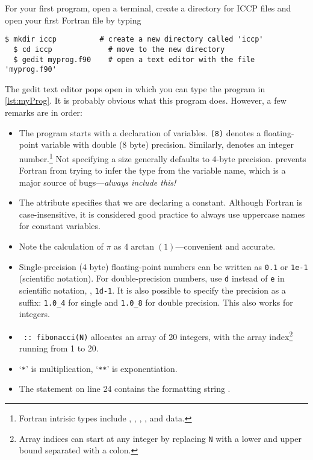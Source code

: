 For your first program, open a terminal, create a directory for ICCP files and open your first Fortran file by typing
\begin{lstlisting}[style=prompt, nolol]
  $ mkdir iccp          # create a new directory called 'iccp'
  $ cd iccp             # move to the new directory
  $ gedit myprog.f90    # open a text editor with the file 'myprog.f90'
\end{lstlisting}
The gedit text editor pops open in which you can type the program in \autoref{lst:myProg}.
It is probably obvious what this program does. However, a few remarks are in order:
\begin{itemize}
  \item The program starts with a declaration of variables.
    \texttt{(8)} denotes a floating-point variable with double (8 byte) precision.
    Similarly,  denotes an integer number.\footnote{Fortran intrisic types include , , , , and  data.}
    Not specifying a size generally defaults to 4-byte precision.
     prevents Fortran from trying to infer the type from the variable name, which is a major source of bugs---\emph{always include this!}
  \item The attribute  specifies that we are declaring a constant.
    Although Fortran is case-insensitive, it is considered good practice to always use uppercase names for constant variables.
  \item Note the calculation of $\pi$ as $4\arctan(1)$---convenient and accurate.
  \item Single-precision (4 byte) floating-point numbers can be written as \texttt{0.1} or \texttt{1e-1} (scientific notation).
    For double-precision numbers, use \texttt{d} instead of \texttt{e} in scientific notation, \eg, \texttt{1d-1}.
    It is also possible to specify the precision as a suffix: \texttt{1.0\_4} for single and \texttt{1.0\_8} for double precision.
    This also works for integers.
  \item \texttt{ :: fibonacci(N)} allocates an array of 20
    integers, with the array index\footnote{Array indices can start at any integer by replacing \texttt{N} with a lower and upper bound separated with a colon.} running from 1 to 20.
  \item `\texttt{*}' is multiplication, `\texttt{**}' is exponentiation.
  \item The  statement on line 24 contains the formatting string .

\end{itemize}
